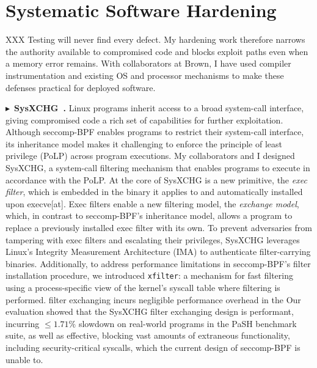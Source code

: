 \documentclass[10pt,letterpaper]{article}
\newcommand{\project}[2]{\par\Needspace{6\baselineskip}\noindent
  $\blacktriangleright$~\textbf{#1~\cite{#2}.}}
\begin{document}
\section{Systematic Software Hardening}
XXX Testing will never find every defect. My hardening work therefore narrows the
authority available to compromised code and blocks exploit paths even when a
memory error remains. With collaborators at Brown, I have used compiler
instrumentation and existing OS and processor mechanisms to make these defenses
practical for deployed software.

\project{SysXCHG}{sysxchg}
Linux programs inherit access to a broad system-call interface, giving 
compromised code a rich set of capabilities for further exploitation. 
Although seccomp-BPF enables programs to restrict their system-call interface, 
its inheritance model makes it challenging to enforce the principle of least
privilege (PoLP) across program executions.
My collaborators and I designed SysXCHG, a system-call filtering mechanism that
enables programs to execute in accordance with the PoLP. At the core of SysXCHG
is a new primitive, the \emph{exec filter}, which is embedded in the binary it
applies to and automatically installed upon execve[at].
Exec filters enable a new
filtering model, the \emph{exchange model}, which, in contrast to seccomp-BPF's
inheritance model, allows a program to replace a previously installed exec
filter with its own. To prevent
adversaries from tampering with exec filters and escalating their privileges,
SysXCHG leverages Linux's Integrity Measurement Architecture (IMA) to
authenticate filter-carrying binaries. Additionally, to address performance
limitations in seccomp-BPF's filter installation procedure, we introduced
\texttt{xfilter}:  a mechanism for fast filtering using a process-specific
view of the kernel's syscall table where filtering is performed.
filter exchanging incurs negligible performance overhead in the
Our evaluation showed that the SysXCHG filter exchanging
design is performant, incurring $\le 1.71\%$ slowdown on real-world
programs in the PaSH benchmark suite, as well as effective, blocking
vast amounts of extraneous functionality, including security-critical
syscalls, which the current design of seccomp-BPF is unable to.
\end{document}
